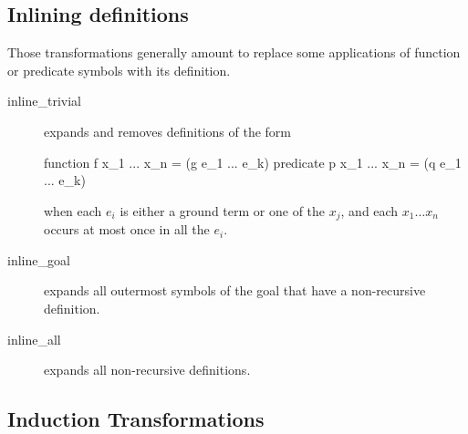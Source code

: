 \subsection{Inlining definitions}

Those transformations generally amount to replace some applications of
function or predicate symbols with its definition.

\begin{description}

\item[inline\_trivial]
  expands and removes definitions of the form
\begin{whycode}
function  f x_1 ... x_n = (g e_1 ... e_k)
predicate p x_1 ... x_n = (q e_1 ... e_k)
\end{whycode}
when each $e_i$ is either a ground term or one of the $x_j$, and
each $x_1 \dots x_n$ occurs at most once in all the $e_i$.

\item[inline\_goal] expands all outermost symbols of the goal that
  have a non-recursive definition.

\item[inline\_all]
  expands all non-recursive definitions.

\end{description}


\subsection{Induction Transformations}

